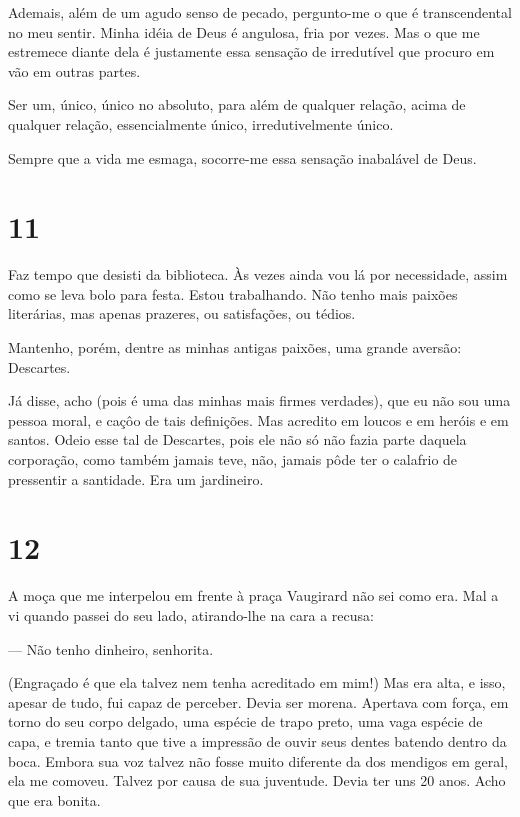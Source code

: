 Ademais, além de um agudo senso de pecado, pergunto-me o que é
transcendental no meu sentir. Minha idéia de Deus é angulosa, fria por
vezes. Mas o que me estremece diante dela é justamente essa sensação de
irredutível que procuro em vão em outras partes.

Ser um, único, único no absoluto, para além de qualquer relação, acima
de qualquer relação, essencialmente único, irredutivelmente único.

Sempre que a vida me esmaga, socorre-me essa sensação inabalável de
Deus.

\section{11}

Faz tempo que desisti da biblioteca. Às vezes ainda vou lá por
necessidade, assim como se leva bolo para festa. Estou trabalhando. Não
tenho mais paixões literárias, mas apenas prazeres, ou satisfações, ou
tédios.

Mantenho, porém, dentre as minhas antigas paixões, uma grande aversão:
Descartes.

Já disse, acho (pois é uma das minhas mais firmes verdades), que eu não
sou uma pessoa moral, e caçôo de tais definições. Mas acredito em loucos
e em heróis e em santos. Odeio esse tal de Descartes, pois ele não só
não fazia parte daquela corporação, como também jamais teve, não, jamais
pôde ter o calafrio de pressentir a santidade. Era um jardineiro.

\section{12}

A moça que me interpelou em frente à praça Vaugirard não sei como era.
Mal a vi quando passei do seu lado, atirando-lhe na cara a recusa:

--- Não tenho dinheiro, senhorita.

(Engraçado é que ela talvez nem tenha acreditado em mim!) Mas era alta,
e isso, apesar de tudo, fui capaz de perceber. Devia ser morena.
Apertava com força, em torno do seu corpo delgado, uma espécie de trapo
preto, uma vaga espécie de capa, e tremia tanto que tive a impressão de
ouvir seus dentes batendo dentro da boca. Embora sua voz talvez não
fosse muito diferente da dos mendigos em geral, ela me comoveu. Talvez
por causa de sua juventude. Devia ter uns 20 anos. Acho que era bonita.

